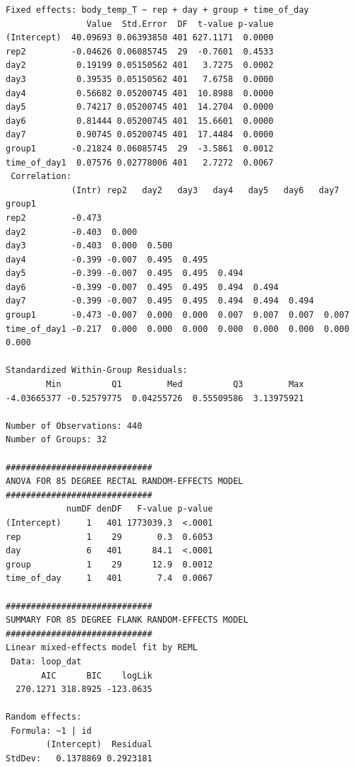 \documentclass[a4paper, 10pt, titlepage]{article}
\begin{document}
\begin{lstlisting}[basicstyle = \footnotesize \ttfamily]
Fixed effects: body_temp_T ~ rep + day + group + time_of_day 
                Value  Std.Error  DF  t-value p-value
(Intercept)  40.09693 0.06393850 401 627.1171  0.0000
rep2         -0.04626 0.06085745  29  -0.7601  0.4533
day2          0.19199 0.05150562 401   3.7275  0.0002
day3          0.39535 0.05150562 401   7.6758  0.0000
day4          0.56682 0.05200745 401  10.8988  0.0000
day5          0.74217 0.05200745 401  14.2704  0.0000
day6          0.81444 0.05200745 401  15.6601  0.0000
day7          0.90745 0.05200745 401  17.4484  0.0000
group1       -0.21824 0.06085745  29  -3.5861  0.0012
time_of_day1  0.07576 0.02778006 401   2.7272  0.0067
 Correlation: 
             (Intr) rep2   day2   day3   day4   day5   day6   day7   group1
rep2         -0.473                                                        
day2         -0.403  0.000                                                 
day3         -0.403  0.000  0.500                                          
day4         -0.399 -0.007  0.495  0.495                                   
day5         -0.399 -0.007  0.495  0.495  0.494                            
day6         -0.399 -0.007  0.495  0.495  0.494  0.494                     
day7         -0.399 -0.007  0.495  0.495  0.494  0.494  0.494              
group1       -0.473 -0.007  0.000  0.000  0.007  0.007  0.007  0.007       
time_of_day1 -0.217  0.000  0.000  0.000  0.000  0.000  0.000  0.000  0.000

Standardized Within-Group Residuals:
        Min          Q1         Med          Q3         Max 
-4.03665377 -0.52579775  0.04255726  0.55509586  3.13975921 

Number of Observations: 440
Number of Groups: 32 

############################# 
ANOVA FOR 85 DEGREE RECTAL RANDOM-EFFECTS MODEL 
#############################
            numDF denDF   F-value p-value
(Intercept)     1   401 1773039.3  <.0001
rep             1    29       0.3  0.6053
day             6   401      84.1  <.0001
group           1    29      12.9  0.0012
time_of_day     1   401       7.4  0.0067

############################# 
SUMMARY FOR 85 DEGREE FLANK RANDOM-EFFECTS MODEL 
#############################
Linear mixed-effects model fit by REML
 Data: loop_dat 
       AIC      BIC    logLik
  270.1271 318.8925 -123.0635

Random effects:
 Formula: ~1 | id
        (Intercept)  Residual
StdDev:   0.1378869 0.2923181


\end{lstlisting}
\end{document}
